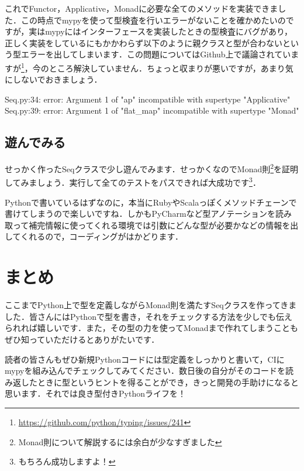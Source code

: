 
これでFunctor，Applicative，Monadに必要な全てのメソッドを実装できました．この時点でmypyを使って型検査を行いエラーがないことを確かめたいのですが，実はmypyにはインターフェースを実装したときの型検査にバグがあり，正しく実装をしているにもかかわらず以下のように親クラスと型が合わないという型エラーを出してしまいます．この問題についてはGithub上で議論されていますが\footnote{\url{https://github.com/python/typing/issues/241}}，今のところ解決していません．ちょっと収まりが悪いですが，あまり気にしないでおきましょう．

\begin{bashcode}
Seq.py:34: error: Argument 1 of "ap" incompatible with supertype "Applicative"
Seq.py:39: error: Argument 1 of "flat_map" incompatible with supertype "Monad"
\end{bashcode}

\subsection{遊んでみる}
せっかく作ったSeqクラスで少し遊んでみます．せっかくなのでMonad則\footnote{Monad則について解説するには余白が少なすぎました}を証明してみましょう．実行して全てのテストをパスできれば大成功です\footnote{もちろん成功しますよ！}．

Pythonで書いているはずなのに，本当にRubyやScalaっぽくメソッドチェーンで書けてしまうので楽しいですね．しかもPyCharmなど型アノテーションを読み取って補完情報に使ってくれる環境では引数にどんな型が必要かなどの情報を出してくれるので，コーディングがはかどります．


\section{まとめ}
ここまでPython上で型を定義しながらMonad則を満たすSeqクラスを作ってきました．皆さんにはPythonで型を書き，それをチェックする方法を少しでも伝えられれば嬉しいです．また，その型の力を使ってMonadまで作れてしまうこともぜひ知っていただけるとありがたいです．

読者の皆さんもぜひ新規Pythonコードには型定義をしっかりと書いて，CIにmypyを組み込んでチェックしてみてください．数日後の自分がそのコードを読み返したときに型というヒントを得ることができ，きっと開発の手助けになると思います．それでは良き型付きPythonライフを！
